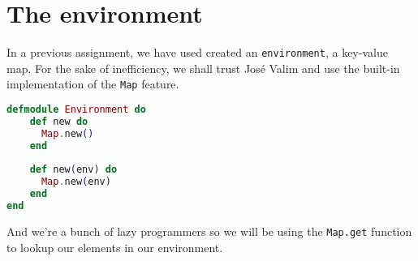 \section{The environment}
In a previous assignment, we have used created an \texttt{environment}, a key-value map. For the sake of inefficiency, we shall trust José Valim and use the built-in implementation of the \texttt{Map} feature.


\begin{lstlisting}[language=Elixir, caption=For loop that executes each term ]
defmodule Environment do
    def new do
      Map.new()
    end
  
    def new(env) do
      Map.new(env)
    end
end
\end{lstlisting}

And we're a bunch of lazy programmers so we will be using the \texttt{Map.get} function to lookup our elements in our environment.

